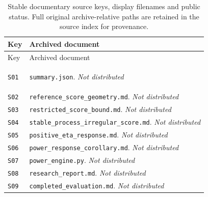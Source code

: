 \begin{longtable}{@{}>{\raggedright\arraybackslash}p{}>{\raggedright\arraybackslash}p{}@{}}
\caption{Stable documentary source keys, display filenames and public status. Full original archive-relative paths are retained in the source index for provenance.}\label{tab:source-keys}\\
\toprule Key & Archived document \\ \midrule\endfirsthead
\toprule Key & Archived document \\ \midrule\endhead
\hypertarget{S01}{}\label{source:S01}\texttt{S01} & \nolinkurl{summary.json}. \textit{Not distributed} \\
\hypertarget{S02}{}\label{source:S02}\texttt{S02} & \nolinkurl{reference_score_geometry.md}. \textit{Not distributed} \\
\hypertarget{S03}{}\label{source:S03}\texttt{S03} & \nolinkurl{restricted_score_bound.md}. \textit{Not distributed} \\
\hypertarget{S04}{}\label{source:S04}\texttt{S04} & \nolinkurl{stable_process_irregular_score.md}. \textit{Not distributed} \\
\hypertarget{S05}{}\label{source:S05}\texttt{S05} & \nolinkurl{positive_eta_response.md}. \textit{Not distributed} \\
\hypertarget{S06}{}\label{source:S06}\texttt{S06} & \nolinkurl{power_response_corollary.md}. \textit{Not distributed} \\
\hypertarget{S07}{}\label{source:S07}\texttt{S07} & \nolinkurl{power_engine.py}. \textit{Not distributed} \\
\hypertarget{S08}{}\label{source:S08}\texttt{S08} & \nolinkurl{research_report.md}. \textit{Not distributed} \\
\hypertarget{S09}{}\label{source:S09}\texttt{S09} & \nolinkurl{completed_evaluation.md}. \textit{Not distributed} \\

\end{longtable}
